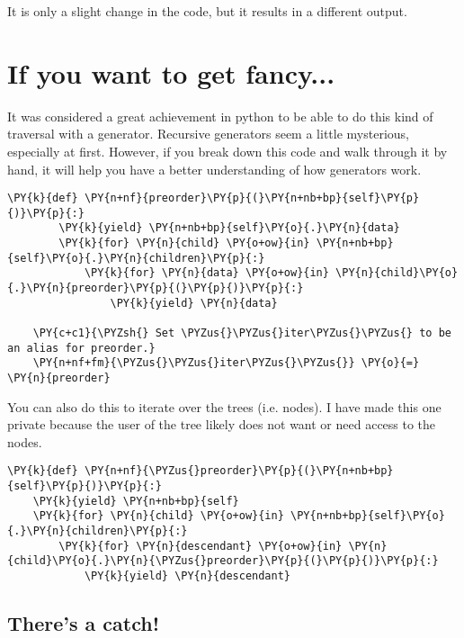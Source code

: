 It is only a slight change in the code, but it results in a different output.

\section{If you want to get fancy...}


It was considered a great achievement in python to be able to do this kind of traversal with a generator.  Recursive generators seem a little mysterious, especially at first.  However, if you break down this code and walk through it by hand, it will help you have a better understanding of how generators work.

\begin{Verbatim}[commandchars=\\\{\}]
    \PY{k}{def} \PY{n+nf}{preorder}\PY{p}{(}\PY{n+nb+bp}{self}\PY{p}{)}\PY{p}{:}
        \PY{k}{yield} \PY{n+nb+bp}{self}\PY{o}{.}\PY{n}{data}
        \PY{k}{for} \PY{n}{child} \PY{o+ow}{in} \PY{n+nb+bp}{self}\PY{o}{.}\PY{n}{children}\PY{p}{:}
            \PY{k}{for} \PY{n}{data} \PY{o+ow}{in} \PY{n}{child}\PY{o}{.}\PY{n}{preorder}\PY{p}{(}\PY{p}{)}\PY{p}{:}
                \PY{k}{yield} \PY{n}{data}

    \PY{c+c1}{\PYZsh{} Set \PYZus{}\PYZus{}iter\PYZus{}\PYZus{} to be an alias for preorder.}
    \PY{n+nf+fm}{\PYZus{}\PYZus{}iter\PYZus{}\PYZus{}} \PY{o}{=} \PY{n}{preorder}
\end{Verbatim}



You can also do this to iterate over the trees (i.e. nodes).  I have made this one private because the user of the tree likely does not want or need access to the nodes.

\begin{Verbatim}[commandchars=\\\{\}]
\PY{k}{def} \PY{n+nf}{\PYZus{}preorder}\PY{p}{(}\PY{n+nb+bp}{self}\PY{p}{)}\PY{p}{:}
    \PY{k}{yield} \PY{n+nb+bp}{self}
    \PY{k}{for} \PY{n}{child} \PY{o+ow}{in} \PY{n+nb+bp}{self}\PY{o}{.}\PY{n}{children}\PY{p}{:}
        \PY{k}{for} \PY{n}{descendant} \PY{o+ow}{in} \PY{n}{child}\PY{o}{.}\PY{n}{\PYZus{}preorder}\PY{p}{(}\PY{p}{)}\PY{p}{:}
            \PY{k}{yield} \PY{n}{descendant}
\end{Verbatim}


\subsection{There's a catch!}


